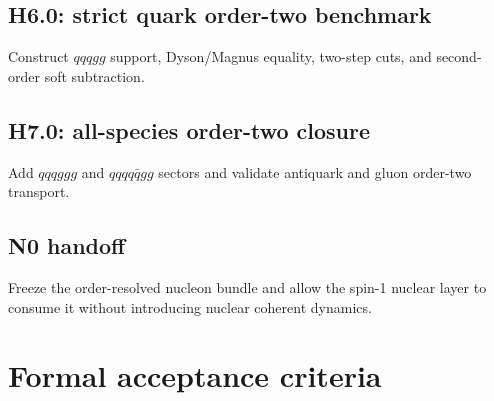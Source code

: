\documentclass[11pt]{article}
\begin{document}
\subsection{H6.0: strict quark order-two benchmark}
Construct \(qqqgg\) support, Dyson/Magnus equality, two-step cuts, and
second-order soft subtraction.

\subsection{H7.0: all-species order-two closure}
Add \(qqqggg\) and \(qqqq\bar qgg\) sectors and validate antiquark and gluon
order-two transport.

\subsection{N0 handoff}
Freeze the order-resolved nucleon bundle and allow the spin-1 nuclear layer to
consume it without introducing nuclear coherent dynamics.

\section{Formal acceptance criteria}
\label{sec:acceptance}
\end{document}
